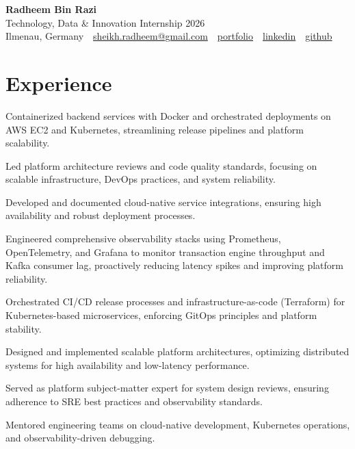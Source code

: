 \documentclass[11pt,a4paper]{resume}
\makeatletter
\newcommand{\Portfolio}{https://radheem.github.io/my-cv}
\newcommand{\PortfolioText}{portfolio}
\newcommand{\GitHub}{https://github.com/radheem}
\newcommand{\LinkedIn}{https://www.linkedin.com/in/radheem-razi}
\newcommand{\Email}{sheikh.radheem@gmail.com}
\makeatother
\begin{document}
\begin{center}
  {\huge\bfseries Radheem Bin Razi}\\[3pt]
  {\large Technology, Data \& Innovation Internship 2026}\\[6pt]
  \small
  Ilmenau, Germany \,\textbar\,
  \href{mailto:\Email}{\Email} \,\textbar\,
  \href{\Portfolio}{\PortfolioText} \,\textbar\,
  \href{\LinkedIn}{linkedin} \,\textbar\,
  \href{\GitHub}{github}
\end{center}
\vspace{2pt}

\section{Experience}

\bullets
  \item Containerized backend services with Docker and orchestrated deployments on AWS EC2 and Kubernetes, streamlining release pipelines and platform scalability.
  \item Led platform architecture reviews and code quality standards, focusing on scalable infrastructure, DevOps practices, and system reliability.
  \item Developed and documented cloud-native service integrations, ensuring high availability and robust deployment processes.
\bulletsend
\vspace{3pt}
\bullets
  \item Engineered comprehensive observability stacks using Prometheus, OpenTelemetry, and Grafana to monitor transaction engine throughput and Kafka consumer lag, proactively reducing latency spikes and improving platform reliability.
  \item Orchestrated CI/CD release processes and infrastructure-as-code (Terraform) for Kubernetes-based microservices, enforcing GitOps principles and platform stability.
  \item Designed and implemented scalable platform architectures, optimizing distributed systems for high availability and low-latency performance.
  \item Served as platform subject-matter expert for system design reviews, ensuring adherence to SRE best practices and observability standards.
  \item Mentored engineering teams on cloud-native development, Kubernetes operations, and observability-driven debugging.
\end{document}
